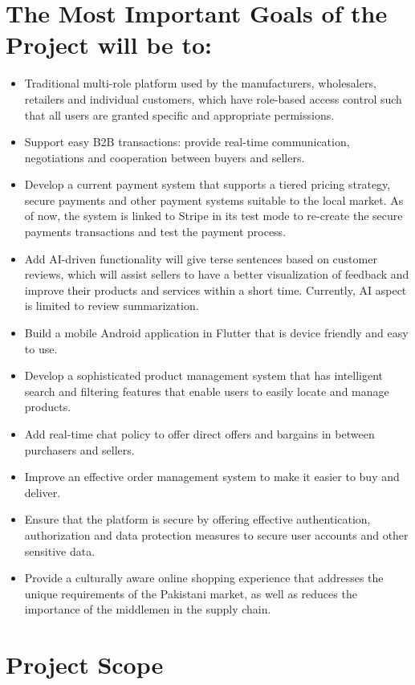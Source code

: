 \section*{The Most Important Goals of the Project will be to:}
\begin{itemize}
\item Traditional multi-role platform used by the manufacturers, wholesalers, retailers and individual customers, which have role-based access control such that all users are granted specific and appropriate permissions.
\item Support easy B2B transactions: provide real-time communication, negotiations and cooperation between buyers and sellers.
\item Develop a current payment system that supports a tiered pricing strategy, secure payments and other payment systems suitable to the local market. As of now, the system is linked to Stripe in its test mode to re-create the secure payments transactions and test the payment process.
\item Add AI-driven functionality will give terse sentences based on customer reviews, which will assist sellers to have a better visualization of feedback and improve their products and services within a short time. Currently, AI aspect is limited to review summarization.
\item Build a mobile Android application in Flutter that is device friendly and easy to use.
\item Develop a sophisticated product management system that has intelligent search and filtering features that enable users to easily locate and manage products.
\item Add real-time chat policy to offer direct offers and bargains in between purchasers and sellers.
\item Improve an effective order management system to make it easier to buy and deliver.
\item Ensure that the platform is secure by offering effective authentication, authorization and data protection measures to secure user accounts and other sensitive data.
\item Provide a culturally aware online shopping experience that addresses the unique requirements of the Pakistani market, as well as reduces the importance of the middlemen in the supply chain.
\end{itemize}
\section{Project Scope}

